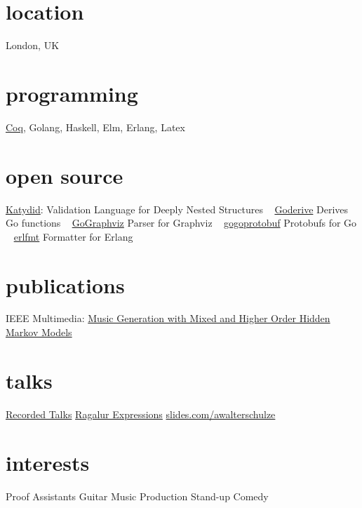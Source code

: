 \documentclass[print]{friggeri-cv-a4} %
\begin{document}

\begin{aside} %
\section{location}
London, UK
\section{programming}
\href{https://coq.inria.fr/}{Coq}, Golang, Haskell, Elm, Erlang, Latex
\section{open source}
\href{https://github.com/katydid/katydid}{Katydid}:
Validation Language for Deeply Nested Structures
~
\href{https://github.com/awalterschulze/goderive}{Goderive} 
Derives Go functions
~
\href{https://github.com/awalterschulze/gographviz}{GoGraphviz} 
Parser for Graphviz
~
\href{https://github.com/gogo/protobuf}{gogoprotobuf} 
Protobufs for Go 
~
\href{https://github.com/WhatsApp/erlfmt}{erlfmt}  
Formatter for Erlang
\section{publications}
IEEE Multimedia: \href{http://doi.ieeecomputersociety.org/10.1109/MMUL.2010.44}{Music Generation with Mixed and Higher Order Hidden Markov Models}
\section{talks}
\href{https://www.youtube.com/playlist?list=PLYwF9EIrl42T3ml_ANaNifOuTQtLxaZgQ}{\faYoutubePlay Recorded Talks}
\href{https://www.youtube.com/playlist?list=PLYwF9EIrl42S9ldgii7kfBEIHPle7PqMk}{\faYoutubePlay Ragalur Expressions} 
\href{https://slides.com/awalterschulze}{slides.com/awalterschulze}
\section{interests}
Proof Assistants
Guitar
Music Production
Stand-up Comedy
\end{aside}
\end{document}
